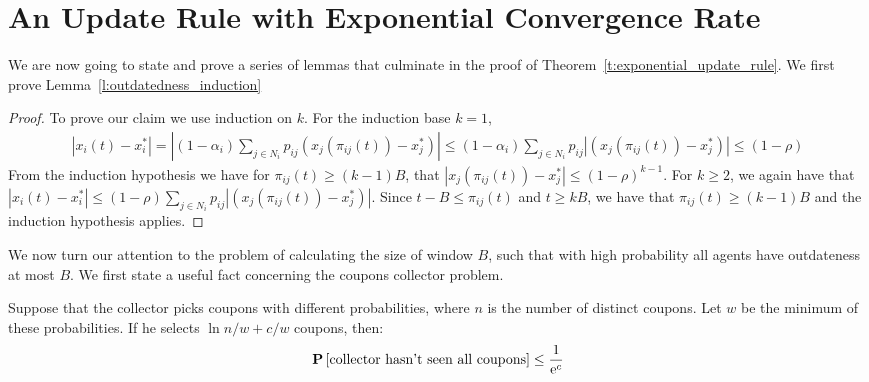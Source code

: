 \section{An Update Rule with Exponential Convergence Rate}\label{app:s:cc_convergence}
We are now going to state and prove a series of lemmas that culminate in
the proof of Theorem~\ref{t:exponential_update_rule}. We first prove 
Lemma~\ref{l:outdatedness_induction}

\begin{proof}
  To prove our claim we use induction on $k$. For the induction base $k=1$,
  \begin{align*}
    |x_i(t) - x_i^*|
    =
    |(1-\alpha_i)\sum_{j \in N_i}p_{ij}(x_j(\pi_{ij}(t)) -x_j^*)|
    \leq
    (1-\alpha_i)\sum_{j \in N_i}p_{ij}|(x_j(\pi_{ij}(t))-x_j^*)|\leq (1-\rho)
  \end{align*}
  From the induction hypothesis we have for $\pi_{ij}(t) \geq (k-1)B$,
  that $|x_j(\pi_{ij}(t))-x_j^*| \leq (1-\rho)^{k-1}$.
  For $k\geq 2$, we again have that
  $|x_i(t) - x_i^*|\leq (1-\rho)\sum_{j \in N_i}p_{ij}|(x_j(\pi_{ij}(t))-x_j^*)|$.
  Since $t-B \leq \pi_{ij}(t)$ and $t\geq kB$, we have
  that $\pi_{ij}(t) \geq (k-1)B$ and the induction hypothesis applies.
\end{proof}

We now turn our attention to
the problem of calculating the size of window $B$, such that with high probability
all agents have outdateness at most $B$.
We first state a useful fact concerning the coupons collector problem.

\begin{lemma}\label{l:coupons_lemma}
Suppose that the collector picks coupons with different
probabilities, where $n$ is the number of distinct coupons.
Let $w$ be the minimum of these probabilities.
If he selects $\ln n/w+ c/w$ coupons, then:
\[
\bm{\mathrm{P}}\left[\text{collector hasn't seen all coupons}\right] \leq \frac{1}{\mathrm{e}^c}
\]
\end{lemma}

